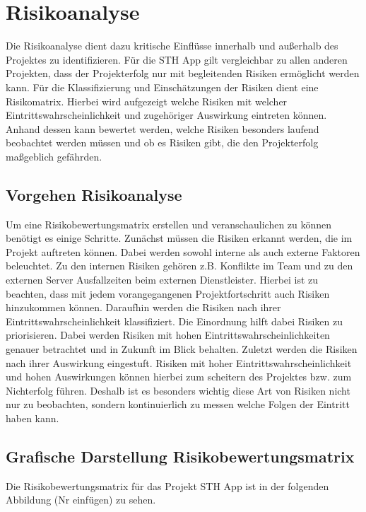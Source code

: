 \chapter{Risikoanalyse}

Die Risikoanalyse dient dazu kritische Einflüsse innerhalb und außerhalb des Projektes zu identifizieren. Für die STH App gilt vergleichbar zu allen anderen Projekten, dass der Projekterfolg nur mit begleitenden Risiken ermöglicht werden kann. Für die Klassifizierung und Einschätzungen der Risiken dient eine Risikomatrix. Hierbei wird aufgezeigt welche Risiken mit welcher Eintrittswahrscheinlichkeit und zugehöriger Auswirkung eintreten können. Anhand dessen kann bewertet werden, welche Risiken besonders laufend beobachtet werden müssen und ob es Risiken gibt, die den Projekterfolg maßgeblich gefährden.

\section{Vorgehen Risikoanalyse}
Um eine Risikobewertungsmatrix erstellen und veranschaulichen zu können benötigt es einige Schritte. Zunächst müssen die Risiken erkannt werden, die im Projekt auftreten können. Dabei werden sowohl interne als auch externe Faktoren beleuchtet. Zu den internen Risiken gehören z.B. Konflikte im Team und zu den externen Server Ausfallzeiten beim externen Dienstleister. Hierbei ist zu beachten, dass mit jedem vorangegangenen Projektfortschritt auch Risiken hinzukommen können. Daraufhin werden die Risiken nach ihrer Eintrittswahrscheinlichkeit klassifiziert. Die Einordnung hilft dabei Risiken zu priorisieren. Dabei werden Risiken mit hohen Eintrittswahrscheinlichkeiten genauer betrachtet und in Zukunft im Blick behalten. Zuletzt werden die Risiken nach ihrer Auswirkung eingestuft. Risiken mit hoher Eintrittswahrscheinlichkeit und hohen Auswirkungen können hierbei zum scheitern des Projektes bzw. zum Nichterfolg führen. Deshalb ist es besonders wichtig diese Art von Risiken nicht nur zu beobachten, sondern kontinuierlich zu messen welche Folgen der Eintritt haben kann.


\section{Grafische Darstellung Risikobewertungsmatrix}
Die Risikobewertungsmatrix für das Projekt STH App ist in der folgenden Abbildung (Nr einfügen) zu sehen.

